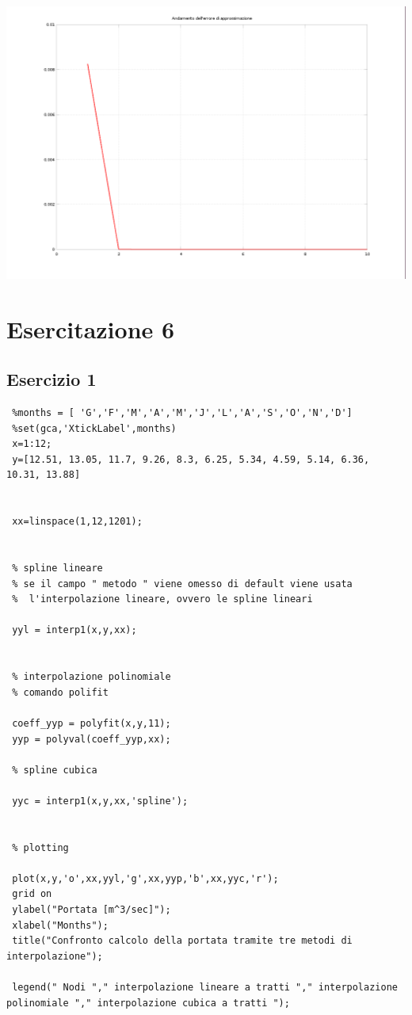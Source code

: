 \documentclass{article}
\begin{document}
\centerline{\includegraphics[scale=0.6]{ex58.png}}


\newpage
\section{ Esercitazione 6}


\subsection{ Esercizio 1}

\begin{lstlisting}
 %months = [ 'G','F','M','A','M','J','L','A','S','O','N','D']
 %set(gca,'XtickLabel',months)
 x=1:12;
 y=[12.51, 13.05, 11.7, 9.26, 8.3, 6.25, 5.34, 4.59, 5.14, 6.36, 10.31, 13.88]


 xx=linspace(1,12,1201);


 % spline lineare  
 % se il campo " metodo " viene omesso di default viene usata
 %  l'interpolazione lineare, ovvero le spline lineari
 
 yyl = interp1(x,y,xx);


 % interpolazione polinomiale
 % comando polifit

 coeff_yyp = polyfit(x,y,11);
 yyp = polyval(coeff_yyp,xx);

 % spline cubica
 
 yyc = interp1(x,y,xx,'spline');

 
 % plotting

 plot(x,y,'o',xx,yyl,'g',xx,yyp,'b',xx,yyc,'r');
 grid on
 ylabel("Portata [m^3/sec]");
 xlabel("Months");
 title("Confronto calcolo della portata tramite tre metodi di interpolazione");

 legend(" Nodi "," interpolazione lineare a tratti "," interpolazione polinomiale "," interpolazione cubica a tratti ");


\end{lstlisting}
\end{document}

